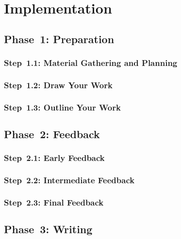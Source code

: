 \documentclass[a4paper]{memoir}
\begin{document}
\chapter{Implementation}
\label{cha:implementation}

\section{Phase~1: Preparation}
\label{sec:preparation:details}

\subsection{Step~1.1: Material Gathering and Planning}
\label{sec:material-organization}

\subsection{Step~1.2: Draw Your Work}
\label{sec:diagramming}

\subsection{Step~1.3: Outline Your Work}
\label{sec:outlining}

\section{Phase~2: Feedback}
\label{sec:feedback:details}

\subsection{Step~2.1: Early Feedback}
\label{sec:early-feedback}

\subsection{Step~2.2: Intermediate Feedback}
\label{sec:intermediate-feedback}

\subsection{Step~2.3: Final Feedback}
\label{sec:final-feedback}

\section{Phase~3: Writing}
\label{sec:phase-3:details}
\end{document}

